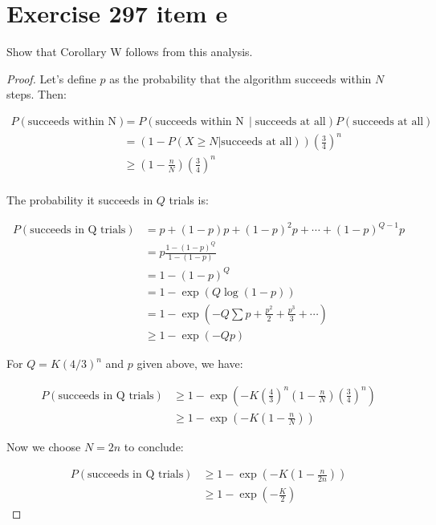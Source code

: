 \documentclass[10pt]{book}
\begin{document}
\section{Exercise 297 item e}

Show that Corollary W follows from this analysis.

\begin{proof}

Let's define $p$ as the probability that the algorithm succeeds within $N$ steps. Then:

\begin{align*}
  P(\text{succeeds within N}) &= P(\text{succeeds within N}\,\mid\text{succeeds at all})
  P(\text{succeeds at all}) \\
  &=\left(1 - P(X\ge N|\text{succeeds at all})\right)\left(\frac{3}{4}\right)^n \\
  &\ge\left(1 - \frac{n}{N}\right)\left(\frac{3}{4}\right)^n \\
\end{align*}

The probability it succeeds in $Q$ trials is:

\begin{align*}
  P(\text{succeeds in Q trials}) 
    &= p + (1-p)p +(1-p)^2p + \cdots + (1-p)^{Q-1}p \\  
    &= p\frac{1 - (1-p)^Q}{1- (1-p)}\\
    &= 1-(1-p)^Q\\
  &= 1-\exp\left(Q\log\left(1-p\right)\right)\\
  &= 1-\exp\left(-Q\sum p+\frac{p^2}{2}+\frac{p^3}{3}+\cdots\right)\\
  &\ge 1-\exp\left(-Qp\right)
\end{align*}

For $Q=K(4/3)^n$ and $p$ given above, we have:

\begin{align*}
  P(\text{succeeds in Q trials})
  &\ge 1-\exp\left(-K\left(\frac{4}{3}\right)^n \left(1-\frac{n}{N}\right)
\left(\frac{3}{4}\right)^n\right) \\
  &\ge 1-\exp\left(-K\left(1-\frac{n}{N}\right)\right)
\end{align*}

Now we choose $N=2n$ to conclude:

\begin{align*}
  P(\text{succeeds in Q trials})
  &\ge 1-\exp\left(-K\left(1-\frac{n}{2n}\right)\right) \\
  &\ge1-\exp\left(-\frac{K}{2}\right)
\end{align*}

\end{proof}
\end{document}
